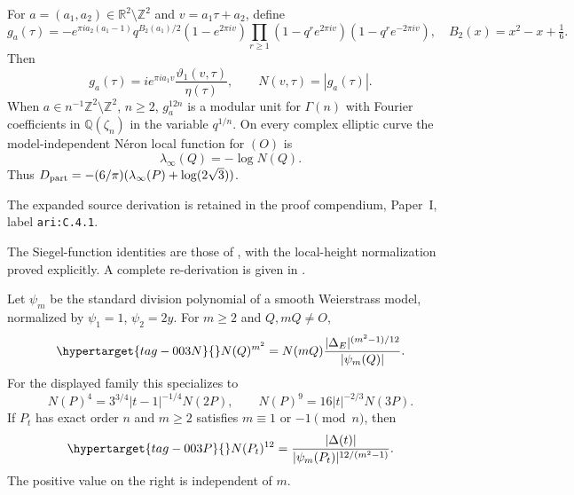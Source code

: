 \begin{cited}\hypertarget{tag-000P}{}\label{ari:C.4.1}

For $a=(a_1,a_2)\in\mathbb R^2\setminus\mathbb Z^2$ and
$v=a_1\tau+a_2$, define
\[
 g_a(\tau)=-e^{\pi ia_2(a_1-1)}q^{B_2(a_1)/2}
 (1-e^{2\pi iv})\prod_{r\ge1}
 (1-q^re^{2\pi iv})(1-q^re^{-2\pi iv}),
 \quad B_2(x)=x^2-x+\tfrac16.
\]
Then
\[
 g_a(\tau)=i e^{\pi ia_1v}
       \frac{\vartheta_1(v,\tau)}{\eta(\tau)},\qquad
 N(v,\tau)=|g_a(\tau)|.
\]
When $a\in n^{-1}\mathbb Z^2\setminus\mathbb Z^2$, $n\ge2$,
$g_a^{12n}$ is a modular unit for $\Gamma(n)$ with Fourier coefficients
in $\mathbb Q(\zeta_n)$ in the variable $q^{1/n}$. On every complex
elliptic curve the model-independent Néron local function for $(O)$ is
\[
 \lambda_\infty(Q)=-\log N(Q).
\]
Thus $D_{\rm part}=-(6/\pi)(\lambda_\infty(P)+\log(2\sqrt3))$.
\end{cited}
The expanded source derivation is retained in the proof compendium, Paper~I, label \nolinkurl{ari:C.4.1}.




The Siegel-function identities are those of \citet[Remark~2.2 and Proposition~2.3]{Shin2015}, with the local-height normalization proved explicitly. A complete re-derivation is given in .


\begin{proposition}\hypertarget{tag-000Q}{}\label{ari:C.4.2}

Let $\psi_m$ be the standard division polynomial of a smooth
Weierstrass model, normalized by $\psi_1=1$, $\psi_2=2y$.
For $m\ge2$ and $Q,mQ\ne O$,
\begin{equation}\hypertarget{tag-003N}{}\label{ari:eq:cs-division}
 N(Q)^{m^2}
       =N(mQ)\frac{|\Delta_E|^{(m^2-1)/12}}{|\psi_m(Q)|}.
\end{equation}
For the displayed family this specializes to
\[
 N(P)^4=3^{3/4}|t-1|^{-1/4}N(2P),\qquad
 N(P)^9=16|t|^{-2/3}N(3P).
\]
If $P_t$ has exact order $n$ and $m\ge2$ satisfies
$m\equiv1$ or $-1\pmod n$, then
\begin{equation}\hypertarget{tag-003P}{}\label{ari:eq:cs-torsionvalue}
 N(P_t)^{12}
       =\frac{|\Delta(t)|}{|\psi_m(P_t)|^{12/(m^2-1)}}.
\end{equation}
The positive value on the right is independent of $m$.
\end{proposition}


